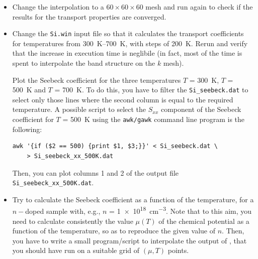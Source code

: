\documentclass[11pt,a4paper]{article}
\begin{document}
\begin{itemize}
  \item Change the interpolation to a $60\times 60\times 60$ mesh and run again
        \postwanx to check if the results for the transport properties are converged.

  \item Change the \texttt{Si.win} input file so that it calculates the transport
        coefficients for temperatures from \SIrange{300}{700}{K}, with steps of
        \SI{200}{K}. Rerun \postwanx and verify that the increase in execution time is
        neglibile (in fact, most of the time is spent to interpolate the band structure
        on the $k$ mesh).

        Plot the Seebeck coefficient for the three temperatures $T$ = \SI{300}{K}, $T$
        = \SI{500}{K} and $T$ = \SI{700}{K}. To do this, you have to filter the
        \texttt{Si\_seebeck.dat} to select only those lines where the second column is
        equal to the required temperature. A possible script to select the $S_{xx}$
        component of the Seebeck coefficient for $T$ = \SI{500}{K} using the
        \texttt{awk/gawk} command line program is the following:
        \begin{verbatim}
awk '{if ($2 == 500) {print $1, $3;}}' < Si_seebeck.dat \
    > Si_seebeck_xx_500K.dat
\end{verbatim}
        Then, you can plot columns 1 and 2 of the output file
        \verb#Si_seebeck_xx_500K.dat#.
  \item Try to calculate the Seebeck coefficient as a function of the temperature, for
        a $n-$doped sample with, e.g., $n$ = \SI{1e18}{cm^{-3}}. Note that to this aim,
        you need to calculate consistently the value $\mu(T)$ of the chemical potential
        as a function of the temperature, so as to reproduce the given value of $n$.
        Then, you have to write a small program/script to interpolate the output of
        \boltzwan, that you should have run on a suitable grid of $(\mu,T)$ points.
\end{itemize}

\printbibliography
\end{document}
